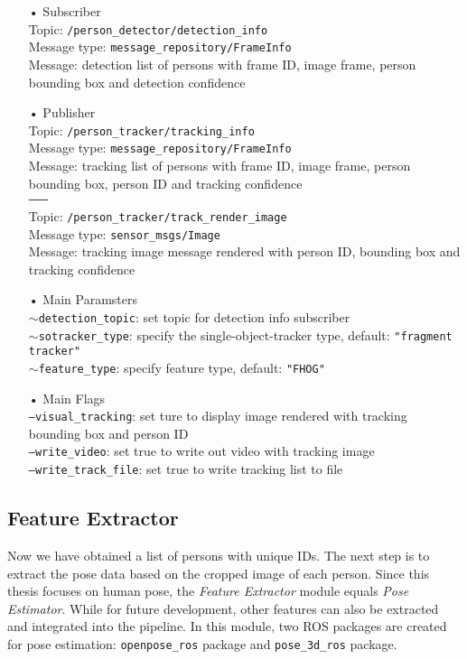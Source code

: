 \begin{itemize}
\item[•] Subscriber \\
Topic: \texttt{/person\_detector/detection\_info} \\
Message type: \texttt{message\_repository/FrameInfo} \\
Message: detection list of persons with frame ID, image frame, person bounding box and detection confidence  

\item[•] Publisher \\
Topic: \texttt{/person\_tracker/tracking\_info} \\
Message type: \texttt{message\_repository/FrameInfo} \\
Message: tracking list of persons with frame ID, image frame, person bounding box, person ID and tracking confidence \\
\texttt{--------} \\
Topic: \texttt{/person\_tracker/track\_render\_image} \\
Message type: \texttt{sensor\_msgs/Image} \\
Message: tracking image message rendered with person ID, bounding box and tracking confidence 

\item[•] Main Paramsters \\
\texttt{$\sim$detection\_topic}: set topic for detection info subscriber \\
\texttt{$\sim$sotracker\_type}: specify the single-object-tracker type, default: \texttt{"fragment tracker"} \\
\texttt{$\sim$feature\_type}: specify feature type, default: \texttt{"FHOG"}

\item[•] Main Flags \\
\texttt{---visual\_tracking}: set ture to display image rendered with tracking bounding box and person ID \\
\texttt{---write\_video}: set true to write out video with tracking image \\
\texttt{---write\_track\_file}: set true to write tracking list to file
\end{itemize}

\subsection{Feature Extractor}
\label{pipeline:FE}
Now we have obtained a list of persons with unique IDs. The next step is to extract the pose data based on the cropped image of each person. Since this thesis focuses on human pose, the \textit{Feature Extractor} module equals \textit{Pose Estimator}. While for future development, other features can also be extracted and integrated into the pipeline. In this module, two ROS packages are created for pose estimation: \texttt{openpose\_ros} package and \texttt{pose\_3d\_ros} package. 

